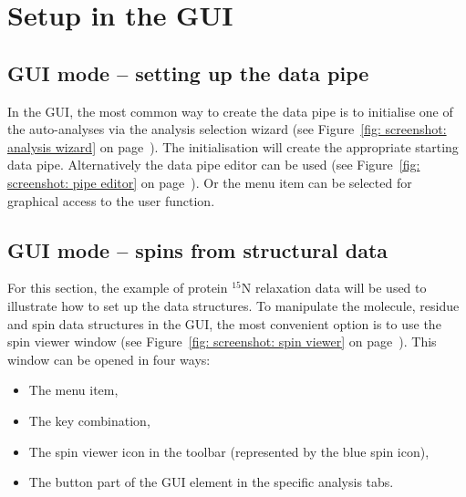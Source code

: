 
\section{Setup in the GUI}



\subsection{GUI mode -- setting up the data pipe} \label{sect: GUI - data pipe}

In the GUI, the most common way to create the data pipe is to initialise one of the auto-analyses via the analysis selection wizard (see Figure~\ref{fig: screenshot: analysis wizard} on page~\pageref{fig: screenshot: analysis wizard}).  The initialisation will create the appropriate starting data pipe.  Alternatively the data pipe editor can be used (see Figure~\ref{fig: screenshot: pipe editor} on page~\pageref{fig: screenshot: pipe editor}).  Or the  menu item can be selected for graphical access to the  user function.




\subsection{GUI mode -- spins from structural data} \label{sect: GUI - structural data}

For this section, the example of protein $^{15}$N relaxation data will be used to illustrate how to set up the data structures.  To manipulate the molecule, residue and spin data structures in the GUI, the most convenient option is to use the spin viewer window (see Figure~\ref{fig: screenshot: spin viewer} on page~\pageref{fig: screenshot: spin viewer}).  This window can be opened in four ways:

\begin{itemize}
\item The  menu item,
\item The  key combination,
\item The spin viewer icon in the toolbar (represented by the blue spin icon),
\item The  button part of the  GUI element in the specific analysis tabs.
\end{itemize}

